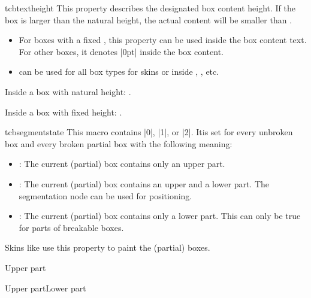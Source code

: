 \pagebreak
\begin{docCommand}[doc new=2016-02-16]{tcbtextheight}{}
  This property describes the designated box content height. If the
  box is larger than the natural height, the actual content will be smaller
  than .
  \begin{itemize}
  \item For boxes with a fixed , this property can
    be used inside the box content text. For other boxes, it denotes |0pt|
    inside the box content.
  \item {} can be used for all box types for skins or
    inside , , etc.
  \end{itemize}

\begin{dispExample}
\begin{tcolorbox}[enhanced,colframe=blue!75!black,
    underlay={\node[left,red] at (frame.east) {Here: \tcbtextheight};}]
  Inside a box with natural height: \tcbtextheight.
\end{tcolorbox}
\begin{tcolorbox}[enhanced,colframe=blue!75!black,height=1cm,
    underlay={\node[left,red] at (frame.east) {Here: \tcbtextheight};}]
  Inside a box with fixed height: \tcbtextheight.
\end{tcolorbox}
\end{dispExample}
\end{docCommand}


\begin{docCommand}[doc new=2017-04-25]{tcbsegmentstate}{}
  This macro contains |0|, |1|, or |2|. Itis set for every unbroken box and every broken partial box
  with the following meaning:
  \begin{itemize}
    \item{}: The current (partial) box contains only an upper part.
    \item{}: The current (partial) box contains an upper and a lower part.
      The segmentation node can be used for positioning.
    \item{}: The current (partial) box contains only a lower part.
      This can only be true for parts of breakable boxes.
  \end{itemize}
  Skins like  use this property to paint the (partial) boxes.
\begin{dispExample}
\begin{tcbraster}[raster equal height,enhanced,
    watermark text=\tcbsegmentstate]
  \begin{tcolorbox}Upper part\end{tcolorbox}
  \begin{tcolorbox}Upper part\tcblower Lower part\end{tcolorbox}
\end{tcbraster}
\end{dispExample}
\end{docCommand}
